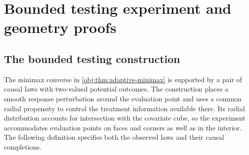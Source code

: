 \section{Bounded testing experiment and geometry proofs}

\subsection{The bounded testing construction}

The minimax converse in \cref{obj:thm:adaptive-minimax} is supported by a pair of causal laws with two-valued potential outcomes. The construction places a smooth response perturbation around the evaluation point and uses a common radial propensity to control the treatment information available there. Its radial distribution accounts for intersection with the covariate cube, so the experiment accommodates evaluation points on faces and corners as well as in the interior. The following definition specifies both the observed laws and their causal completions.

